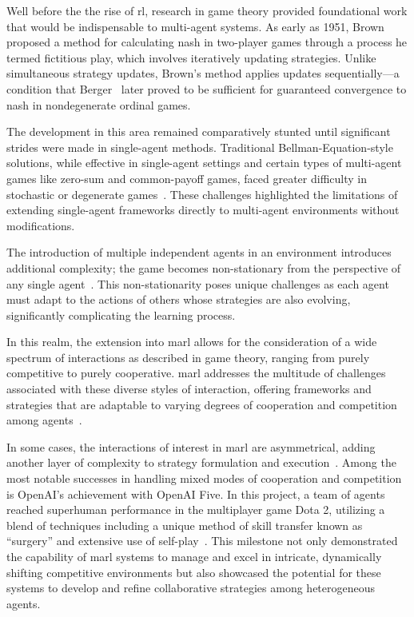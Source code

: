 Well before the the rise of \gls*{rl}, research in game theory 
provided foundational work that would be indispensable to multi-agent systems.
As early as 1951, Brown~\cite{brown1951iterative} proposed a method for 
calculating \gls{nash} in two-player games through a process he termed 
fictitious play, which involves iteratively updating strategies. 
Unlike simultaneous strategy updates, Brown's method applies updates 
sequentially—a condition that Berger~\cite{berger2005, berger2007} 
later proved to be sufficient for guaranteed convergence to 
\gls{nash} in nondegenerate ordinal games. 

The development in this area remained comparatively stunted until 
significant strides were made in single-agent methods. 
Traditional Bellman-Equation-style solutions, while effective in single-agent 
settings and certain types of multi-agent games like zero-sum and 
common-payoff games, faced greater difficulty in stochastic or 
degenerate games~\cite{shoham2007a}.
These challenges highlighted the limitations of extending single-agent 
frameworks directly to multi-agent environments without modifications.

The introduction of multiple independent agents in an environment introduces 
additional complexity; the game becomes non-stationary from 
the perspective of any single agent~\cite{busoniu2008}. 
This non-stationarity poses unique challenges as each agent must adapt 
to the actions of others whose strategies are also evolving, 
significantly complicating the learning process.

In this realm, the extension into \gls{marl} allows for the consideration 
of a wide spectrum of interactions as described in game theory, 
ranging from purely competitive to purely cooperative. 
\gls{marl} addresses the multitude of challenges associated with these 
diverse styles of interaction, offering frameworks and strategies that 
are adaptable to varying degrees of cooperation and competition among 
agents~\cite{lowe2020}.

In some cases, the interactions of interest in \gls{marl} are asymmetrical, 
adding another layer of complexity to strategy formulation and 
execution~\cite*{sun2023}.
Among the most notable successes in handling mixed modes of cooperation 
and competition is OpenAI's achievement with OpenAI Five. In this project, 
a team of agents reached superhuman performance in the multiplayer game Dota 2,
utilizing a blend of techniques including a unique method of skill transfer 
known as ``surgery'' and extensive use of self-play~\cite{berner2019}.
This milestone not only demonstrated the capability of \gls{marl} systems to 
manage and excel in intricate, dynamically shifting competitive environments 
but also showcased the potential for these systems to develop and refine 
collaborative strategies among heterogeneous agents.

